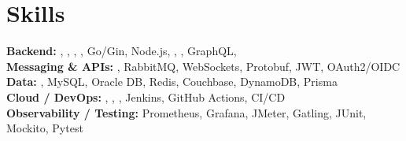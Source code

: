 \section*{Skills}
\BigDivider
\noindent\textbf{Backend:} , , , , Go/Gin, Node.js, , , GraphQL, \\
\textbf{Messaging \& APIs:} , RabbitMQ, WebSockets, Protobuf, JWT, OAuth2/OIDC\\
\textbf{Data:} , MySQL, Oracle DB, Redis, Couchbase, DynamoDB, Prisma\\
\textbf{Cloud / DevOps:} , , , Jenkins, GitHub Actions, CI/CD\\
\textbf{Observability / Testing:} Prometheus, Grafana, JMeter, Gatling, JUnit, Mockito, Pytest